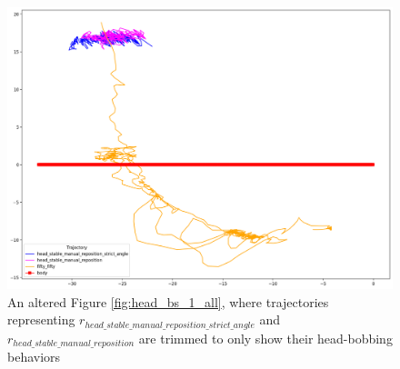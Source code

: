   \begin{figure}[H]
      \centering
      \includegraphics[width=1\textwidth]{figures/head_tracking_results/pigeon_bs_1_all_trimmed_250_550_300_550.png}
      \caption{An altered Figure \ref{fig:head_bs_1_all}, where trajectories representing $r_{head\_stable\_manual\_reposition\_strict\_angle}$ and $r_{head\_stable\_manual\_reposition}$ are trimmed to only show their head-bobbing behaviors}
      \label{fig:head_bs_1_all_trimmed}
  \end{figure}

